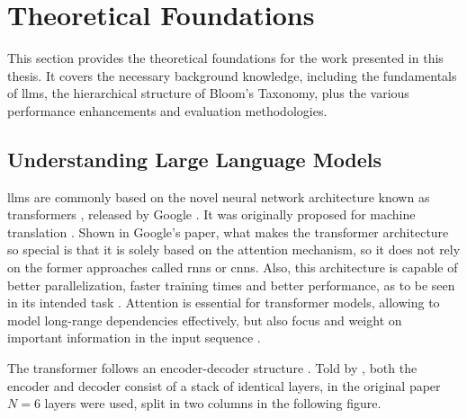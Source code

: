 \section{Theoretical Foundations} \label{sec:theoretical-foundations}

This section provides the theoretical foundations for the work presented in this thesis. It covers the necessary background knowledge, including the fundamentals of \ac{llms}, the hierarchical structure of Bloom's Taxonomy, plus the various performance enhancements and evaluation methodologies.

\subsection{Understanding Large Language Models}

 \ac{llms} are commonly based on the novel neural network architecture known as transformers \cite{naik_large_2024}, released by Google \cite{vaswani_attention_2017}. It was originally proposed for machine translation \cite{minaee_large_2025,vaswani_attention_2017}. Shown in Google's paper, what makes the transformer architecture so special is that it is solely based on the attention mechanism, so it does not rely on the former approaches called \ac{rnns} or \ac{cnns}. Also, this architecture is capable of better parallelization, faster training times and better performance, as to be seen in its intended task \cite{vaswani_attention_2017}. Attention is essential for transformer models, allowing to model long-range dependencies effectively, but also focus and weight on important information in the input sequence \cite{patil_review_2024}. 

The transformer follows an encoder-decoder structure \cite{patil_review_2024,minaee_large_2025}. Told by \cite{minaee_large_2025,vaswani_attention_2017}, both the encoder and decoder consist of a stack of identical layers, in the original paper $N=6$ layers were used, split in two columns in the following figure.

